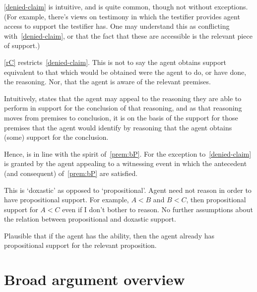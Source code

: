 \begin{note}[\mp{} is intuitive]
  \ref{denied-claim} is intuitive, and is quite common, though not without exceptions.
(For example, there's views on testimony in which the testifier provides agent access to support the testifier has.
One may understand this as conflicting with~\ref{denied-claim}, or that the fact that these are accessible is the relevant piece of support.)
\end{note}

\begin{note}[Alternative]
  \ref{rC} restricts~\ref{denied-claim}.
  This is not to say the agent obtains support equivalent to that which would be obtained were the agent to do, or have done, the reasoning.
  Nor, that the agent is aware of the relevant premises.

  Intuitively, \rC{} states that the agent may appeal to the reasoning they are able to perform in support for the conclusion of that reasoning, and as that reasoning moves from premises to conclusion, it is on the basis of the support for those premises that the agent would identify by reasoning that the agent obtains (some) support for the conclusion.

  Hence, \rC{} is in line with the spirit of~\ref{prem:bP}.
  For the exception to~\ref{denied-claim} is granted by the agent appealing to a witnessing event in which the antecedent (and consequent) of~\ref{prem:bP} are satisfied.
\end{note}

\begin{note}
  This is `doxastic' as opposed to `propositional'.
  Agent need not reason in order to have propositional support.
  For example, \(A < B\) and \(B < C\), then propositional support for \(A < C\) even if I don't bother to reason.
  No further assumptions about the relation between propositional and doxastic support.
\end{note}

\begin{note}
  Plausible that if the agent has the ability, then the agent already has propositional support for the relevant proposition.
\end{note}

\section{Broad argument overview}
\label{sec:broad-argum-overv}

